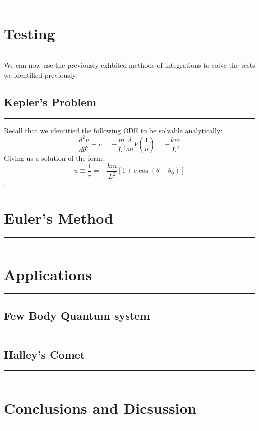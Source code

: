 \documentclass[hidelinks, 11pt, dvipsnames]{article}
\newcommand{\psection}[1]{{
    \begin{center}
        \noindent \rule{17cm}{0.4pt}
            \section*{\LARGE #1}
        \noindent \rule{17cm}{0.4pt}
    \end{center}
}}
\newcommand{\psubsection}[1]{{
    \begin{center}
            \section*{\Large #1}
        \noindent \rule{17cm}{0.2pt}
    \end{center}
}}
\newcommand{\psubsubsection}[1]{{
    \section*{#1}
    \noindent \rule{17cm}{0.11pt}
}}
\begin{document}
\newpage
\psection{Testing}
We can now use the previously exhbited methods of integrations to solve the tests we identified previously. 

\psubsection{Kepler's Problem}
Recall that we identitied the following ODE to be solvable analytically:
$$ \frac{d^2 u}{d\theta^2} + u = -\frac{m}{L^2}  \frac{d}{du} V\left( \frac 1 u\right) = -\frac{km}{L^2} $$
Giving us a solution of the form:
$$u \equiv \frac{1}{r} = -\frac{km}{L^2} \left[ 1 + e \cos(\theta - \theta_0) \right]
$$.

 
\psubsubsection{Euler's Method}

\newpage
\psection{Applications}
\psubsection{Few Body Quantum system}
\psubsection{Halley's Comet}


\newpage
\psection{Conclusions and Dicsussion}
\end{document}
